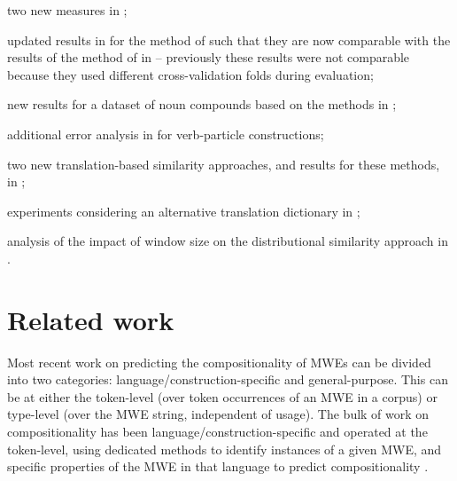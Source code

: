 \documentclass[output=paper,modfonts,nonflat]{langsci/langscibook}
\begin{document}
\begin{compactitem}
\item two new  measures in
  ;
\item updated results in  for the method of
  \cite{salehi2013} such that they are now comparable with the results
  of the method of \cite{DBLP:conf/eacl/SalehiCB14} in
   -- previously these results were not
  comparable because they used different cross-validation folds during
  evaluation;
\item new results for a dataset of  noun compounds
  based on the  methods in ;
\item additional error analysis in  for
   verb-particle constructions;
\item two new translation-based similarity approaches, and results
  for these methods, in ;
\item experiments considering an alternative translation dictionary in
  ;
\item analysis of the impact of window size on the distributional
  similarity approach in .
\end{compactitem}

\section{Related work}
\label{sec:RW}


Most recent work on predicting the compositionality of MWEs can be
divided into two categories: language/construction-specific and
general-purpose. This can be at either the token-level (over token
occurrences of an MWE in a corpus) or type-level (over the MWE string,
independent of usage). The bulk of work on compositionality has been
language/construction-specific and operated at the token-level, using
dedicated methods to identify instances of a given MWE, and specific
properties of the MWE in that language to predict compositionality
\citep{lin1999,kim2007,fazly-cook-stevenson:2009:CL}.
\end{document}
